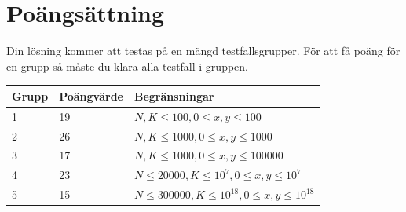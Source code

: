 \section*{Poängsättning}
Din lösning kommer att testas på en mängd testfallsgrupper. För att få poäng för en grupp så måste du klara alla testfall i gruppen.

\begin{tabular}{| l | l | l |}
	\hline
	Grupp & Poängvärde & Begränsningar\\ \hline
	1 & 19 & $N, K \le 100, 0 \le x, y \le 100$ \\ \hline
	2 & 26 & $N, K \le 1000, 0 \le x, y \le 1000$ \\ \hline
	3 & 17 & $N, K \le 1000, 0 \le x, y \le 100000$ \\ \hline
	4 & 23 & $N \le 20000, K \le 10^7, 0 \le x, y \le 10^7$ \\ \hline
	5 & 15 & $N \le 300000, K \le 10^{18}, 0 \le x, y \le 10^{18}$ \\ \hline
\end{tabular}
